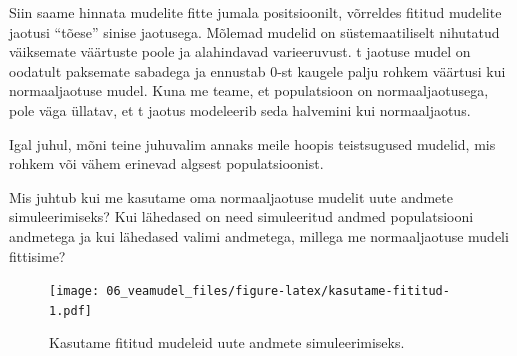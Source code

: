 \documentclass[]{book}
\newenvironment{Shaded}{\begin{snugshade}}{\end{snugshade}}
\newcommand{\CommentTok}[1]{\textcolor[rgb]{0.56,0.35,0.01}{\textit{#1}}}
\newcommand{\DataTypeTok}[1]{\textcolor[rgb]{0.13,0.29,0.53}{#1}}
\newcommand{\DecValTok}[1]{\textcolor[rgb]{0.00,0.00,0.81}{#1}}
\newcommand{\KeywordTok}[1]{\textcolor[rgb]{0.13,0.29,0.53}{\textbf{#1}}}
\newcommand{\NormalTok}[1]{#1}
\newcommand{\OperatorTok}[1]{\textcolor[rgb]{0.81,0.36,0.00}{\textbf{#1}}}
\newcommand{\StringTok}[1]{\textcolor[rgb]{0.31,0.60,0.02}{#1}}
\begin{document}
Siin saame hinnata mudelite fitte jumala positsioonilt, võrreldes fititud mudelite jaotusi ``tõese'' sinise jaotusega.
Mõlemad mudelid on süstemaatiliselt nihutatud väiksemate väärtuste poole ja alahindavad varieeruvust. t jaotuse mudel on oodatult paksemate sabadega ja ennustab 0-st kaugele palju rohkem väärtusi kui normaaljaotuse mudel. Kuna me teame, et populatsioon on normaaljaotusega, pole väga üllatav, et t jaotus modeleerib seda halvemini kui normaaljaotus.

Igal juhul, mõni teine juhuvalim annaks meile hoopis teistsugused mudelid, mis rohkem või vähem erinevad algsest populatsioonist.

Mis juhtub kui me kasutame oma normaaljaotuse mudelit uute andmete simuleerimiseks? Kui lähedased on need simuleeritud andmed populatsiooni andmetega ja kui lähedased valimi andmetega, millega me normaaljaotuse mudeli fittisime?



\begin{Shaded}
\end{Shaded}

\begin{figure}
\centering
\texttt{[image: 06\_veamudel\_files/figure-latex/kasutame-fititud-1.pdf]}
\caption{\label{fig:kasutame-fititud}Kasutame fititud mudeleid uute andmete simuleerimiseks.}
\end{figure}
\end{document}
